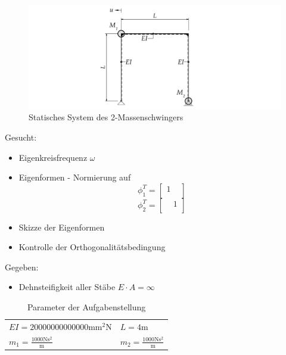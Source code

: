 \documentclass[
  letterpaper,
  DIV=11]{scrreprt}
\providecommand{\tightlist}{%
  \setlength{\itemsep}{0pt}\setlength{\parskip}{0pt}}\usepackage{longtable,booktabs,array}
\begin{document}
\begin{figure}[H]

{\centering \includegraphics{index_files/mediabag/bilder/aufgabe_mms_nach_system.pdf}

}

\caption{\label{fig-mms_nach_system}Statisches System des
2-Massenschwingers}

\end{figure}

Gesucht:

\begin{itemize}
\item
  Eigenkreisfrequenz \(\omega\)
\item
  Eigenformen - Normierung auf \[\phi_1^T = 
  \begin{bmatrix}
  1 &  \\
  \end{bmatrix} \] \[\phi_2^T =
  \begin{bmatrix}
   & 1 \\
  \end{bmatrix}\]
\item
  Skizze der Eigenformen
\item
  Kontrolle der Orthogonalitätsbedingung
\end{itemize}

Gegeben:

\begin{itemize}
\tightlist
\item
  Dehnsteifigkeit aller Stäbe \(E\cdot A = \infty\)
\end{itemize}

\hypertarget{tbl-parameter_mms1}{}
\begin{longtable}[]{@{}
  >{\raggedright\arraybackslash}p{}
  >{\raggedright\arraybackslash}p{}@{}}
\caption{\label{tbl-parameter_mms1}Parameter der
Aufgabenstellung}\tabularnewline
\toprule\noalign{}
\endfirsthead
\endhead
\bottomrule\noalign{}
\endlastfoot
\(EI = 20000000000000 \text{mm}^{2} \text{N}\) & \(L = 4 \text{m}\) \\
\(m_{1} = \frac{1000 \text{N} \text{s}^{2}}{\text{m}}\) &
\(m_{2} = \frac{1000 \text{N} \text{s}^{2}}{\text{m}}\) \\
\end{longtable}
\end{document}
